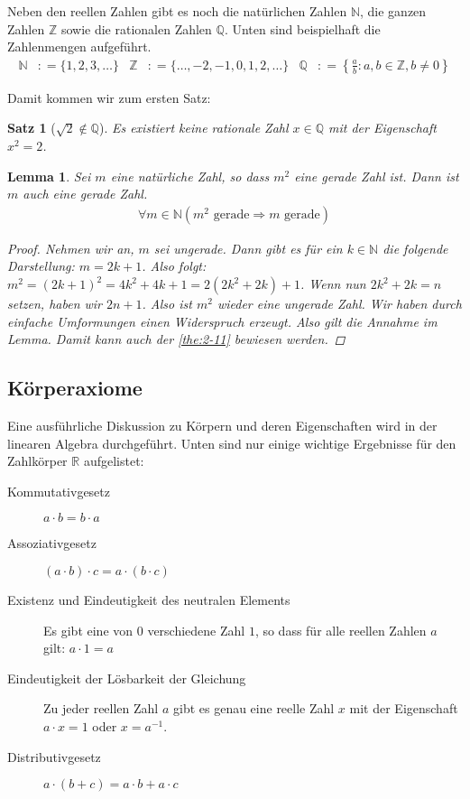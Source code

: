 \documentclass[ngerman,titlepage,twoside, parskip=half*]{scrreprt}
\newcommand*{\N}{\mathbb{N}}
\newcommand*{\Z}{\mathbb{Z}}
\newcommand*{\Q}{\mathbb{Q}}
\newcommand*{\R}{\mathbb{R}}
\theoremstyle{plain}
\newtheorem{lemma}{Lemma}
\newtheorem{theorem}{Satz}[section]
\theoremstyle{definition}
\theoremstyle{remark}
\newcommand*{\coloneqq}{\mathrel{\mathop:}=}
\begin{document}
Neben den reellen Zahlen gibt es noch die natürlichen Zahlen $\N$, die
ganzen Zahlen $\Z$ sowie die rationalen Zahlen $\Q$. Unten sind
beispielhaft die Zahlenmengen aufgeführt.
\begin{align*}
\N &\coloneqq \{1,2,3,\ldots\} &
\Z &\coloneqq \{\ldots ,-2,-1,0,1,2,\ldots\} &
\Q &\coloneqq \left\{\frac{a}{b}\colon a,b\in \Z, b \neq 0\right\}
\end{align*}

Damit kommen wir zum ersten Satz:
\begin{theorem}[$\sqrt{2}\notin \Q$]
  \label{the:2-11}
  Es existiert keine rationale Zahl $x\in \Q$ mit der Eigenschaft
  $x^2=2$.
\end{theorem}

\begin{lemma}
  Sei $m$ eine natürliche Zahl, so dass $m^2$ eine gerade Zahl
  ist. Dann ist $m$ auch eine gerade Zahl.
  \begin{gather*}\forall m \in \N (m^2 \text{ gerade}\Rightarrow m \text{ gerade})\end{gather*}
  \begin{proof}
    Nehmen wir an, $m$ sei ungerade. Dann gibt es für ein $k \in\N$
    die folgende
    Darstellung: $m=2k+1$. Also folgt: $m^{2}= (2k+1)^{2} = 4k^{2}+ 4k+1=
    2(2k^{2}+2k)+1$. Wenn nun $2k^{2}+2k=n$ setzen, haben wir $2n+1$. Also ist
    $m^{2}$ wieder eine ungerade Zahl. Wir haben durch einfache Umformungen
    einen Widerspruch erzeugt. Also gilt die Annahme im Lemma. Damit
    kann auch der \autoref{the:2-11} bewiesen werden.
  \end{proof}
\end{lemma}

\subsection{Körperaxiome}

Eine ausführliche Diskussion zu Körpern und deren Eigenschaften wird
in der linearen Algebra durchgeführt. Unten sind nur einige wichtige
Ergebnisse für den Zahlkörper $\R$ aufgelistet:
\begin{description}
\item[Kommutativgesetz] $a \cdot{} b = b \cdot{} a$
\item[Assoziativgesetz] $(a \cdot{} b) \cdot{} c = a \cdot{} (b
  \cdot{} c)$
\item[Existenz und Eindeutigkeit des neutralen Elements] Es gibt eine
  von $0$ verschiedene Zahl $1$, so dass für alle reellen Zahlen $a$
  gilt: $a \cdot 1 = a$
\item[Eindeutigkeit der Lösbarkeit der Gleichung] Zu jeder reellen
  Zahl $a$ gibt es genau eine reelle Zahl $x$ mit der Eigenschaft $a
  \cdot x = 1$ oder $x = a^{-1}$.
\item[Distributivgesetz] $a \cdot (b+c) = a \cdot b + a \cdot c$
\end{description}
\end{document}

